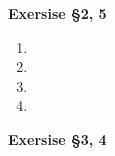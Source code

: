 \documentclass[12pt]{article}
\newenvironment{ques}[1]{\textbf{Exersise #1}\vspace{1 mm}\\ }{\bigskip}
\theoremstyle{definition}
\begin{document}
\begin{ques}{\S 2, 5}
	\begin{enumerate}
		\item

		\item

		\item

		\item

	\end{enumerate}
\end{ques}

\begin{ques}{\S 3, 4}


\end{ques}
\end{document}
